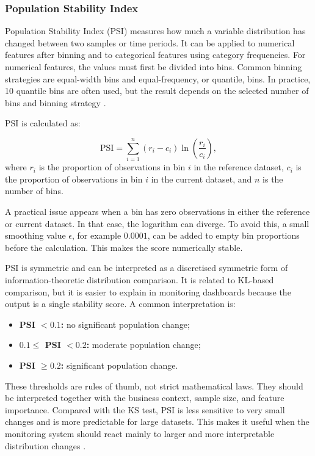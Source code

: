 \subsubsection{Population Stability Index}

Population Stability Index (PSI) measures how much a variable distribution has changed between two samples or time periods. It can be applied to numerical features after binning and to categorical features using category frequencies. For numerical features, the values must first be divided into bins. Common binning strategies are equal-width bins and equal-frequency, or quantile, bins. In practice, 10 quantile bins are often used, but the result depends on the selected number of bins and binning strategy \cite{MonitoringPerformance,EvidentlyDataDriftLargeDatasets}.

PSI is calculated as:

\begin{equation}
\mathrm{PSI} = \sum_{i=1}^{n} (r_i - c_i)\ln\left(\frac{r_i}{c_i}\right),
\end{equation}
where $r_i$ is the proportion of observations in bin $i$ in the reference dataset, $c_i$ is the proportion of observations in bin $i$ in the current dataset, and $n$ is the number of bins.

A practical issue appears when a bin has zero observations in either the reference or current dataset. In that case, the logarithm can diverge. To avoid this, a small smoothing value $\epsilon$, for example $0.0001$, can be added to empty bin proportions before the calculation. This makes the score numerically stable.

PSI is symmetric and can be interpreted as a discretised symmetric form of information-theoretic distribution comparison. It is related to KL-based comparison, but it is easier to explain in monitoring dashboards because the output is a single stability score. A common interpretation is:

\begin{itemize}
    \item \textbf{PSI $< 0.1$:} no significant population change;
    \item \textbf{$0.1 \leq$ PSI $< 0.2$:} moderate population change;
    \item \textbf{PSI $\geq 0.2$:} significant population change.
\end{itemize}

These thresholds are rules of thumb, not strict mathematical laws. They should be interpreted together with the business context, sample size, and feature importance. Compared with the KS test, PSI is less sensitive to very small changes and is more predictable for large datasets. This makes it useful when the monitoring system should react mainly to larger and more interpretable distribution changes \cite{MonitoringPerformance,EvidentlyDataDriftLargeDatasets}.

